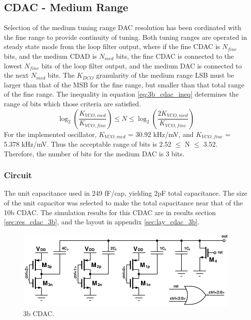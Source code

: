 	\FloatBarrier
	\subsection{CDAC - Medium Range}
	Selection of the medium tuning range DAC resolution has been cordinated with the fine range to provide continuity of tuning. Both tuning ranges are operated in steady state mode from the loop filter output, where if the fine CDAC is $N_{fine}$ bits, and the medium CDAD is $N_{med}$ bits, the fine CDAC is connected to the lowest $N_{fine}$ bits of the loop filter output, and the medium DAC is connected to the next $N_{med}$ bits. The $K_{DCO}$ granularity of the medium range LSB must be larger than that of the MSB for the fine range, but smaller than that total range of the fine range. The inequality in equation \ref{eq:3b_cdac_ineq} determines the range of bits which those criteria are satisfied.
	\begin{equation}\label{eq:3b_cdac_ineq}
		\log_2\left( \frac{K_{VCO,med}}{K_{VCO,fine}}\right) \leq N \leq \log_2\left( \frac{2K_{VCO,med}}{K_{VCO,fine}}\right)
	\end{equation}
	For the implemented oscillator, $K_{VCO,med}$ = 30.92 kHz/mV, and $K_{VCO,fine}$ = 5.378 kHz/mV. Thus the acceptable range of bits is 2.52 $\leq$ N $\leq$ 3.52. Therefore, the number of bits for the medium DAC is 3 bits.
		\subsubsection{Circuit}
		The unit capacitance used in 249 fF/cap, yielding 2pF total capacitance. The size of the unit capacitor was selected to make the total capacitance near that of the 10b CDAC. The simulation results for this CDAC are in results section \ref{sec:res_cdac_3b}, and the layout in appendix \ref{sec:lay_cdac_3b}.
			\begin{figure}[htb!]
			        \centering
			        \includegraphics[width=\textwidth, angle=0]{./figs/design/cdac_3b}
			    \caption{3b CDAC.}
			    \label{fig:3b_cdac_cir}
			\end{figure}

